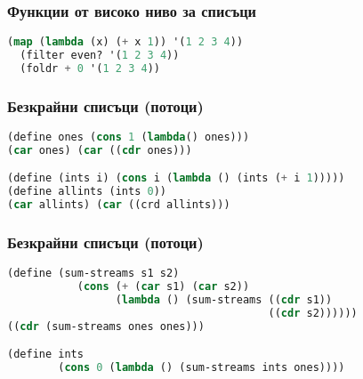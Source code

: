 \documentclass{beamer}
\begin{document}
\begin{frame}[fragile]
\frametitle{Функции от високо ниво за списъци}

\begin{lstlisting}[language=Lisp]
  (map (lambda (x) (+ x 1)) '(1 2 3 4))
  (filter even? '(1 2 3 4))
  (foldr + 0 '(1 2 3 4))
\end{lstlisting}

\end{frame}


\begin{frame}[fragile]
\frametitle{Безкрайни списъци (потоци)}

\begin{lstlisting}[language=Lisp]
(define ones (cons 1 (lambda() ones)))
(car ones) (car ((cdr ones)))

(define (ints i) (cons i (lambda () (ints (+ i 1)))))
(define allints (ints 0))
(car allints) (car ((crd allints)))
\end{lstlisting}

\end{frame}


\begin{frame}[fragile]
\frametitle{Безкрайни списъци (потоци)}

\begin{lstlisting}[language=Lisp]
(define (sum-streams s1 s2) 
           (cons (+ (car s1) (car s2)) 
                 (lambda () (sum-streams ((cdr s1)) 
                                         ((cdr s2))))))
((cdr (sum-streams ones ones)))

(define ints 
        (cons 0 (lambda () (sum-streams ints ones))))
\end{lstlisting}
\end{frame}



\end{document}
